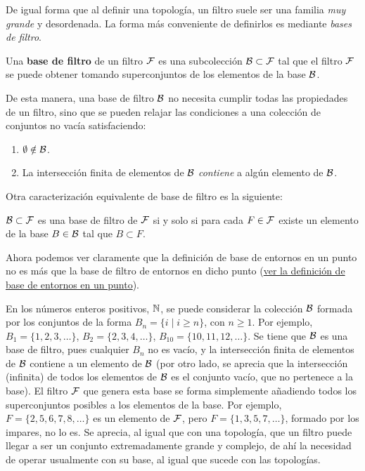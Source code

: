 \begin{amp}
    De igual forma que al definir una topología, un filtro suele ser una familia \textit{muy grande} y desordenada. La forma más conveniente de definirlos es mediante {\it bases de filtro}. 

    \begin{deff}
        Una {\bf base de filtro} de un filtro $\mathcal{F}$ es una subcolección $\mathcal{B}\subset \mathcal{F}$ tal que el filtro $\mathcal{F}$ se puede obtener tomando superconjuntos de los elementos de la base $\mathcal{B}$.
    \end{deff}

    De esta manera, una base de filtro $\mathcal{B}$ no necesita cumplir todas las propiedades de un filtro, sino que se pueden relajar las condiciones a una colección de conjuntos no vacía satisfaciendo:
    \begin{enumerate}[label=--]
        \item $\emptyset \notin \mathcal{B}$.
        \item La intersección finita de elementos de $\mathcal{B}$ {\it contiene} a algún elemento de $\mathcal{B}$.
    \end{enumerate}

    \medskip

    Otra caracterización equivalente de base de filtro es la siguiente:
    \begin{prop}
        $\mathcal{B}\subset\mathcal{F}$ es una base de filtro de $\mathcal{F}$ si y solo si para cada $F\in \mathcal{F}$ existe un elemento de la base $B\in\mathcal{B}$ tal que $B\subset F$.
    \end{prop}    
    Ahora podemos ver claramente que la definición de base de entornos en un punto no es más que la base de filtro de entornos en dicho punto (\hyperlink{def:base_de_entornos}{ver la definición de base de entornos en un punto}).

    \begin{ej}
        En los números enteros positivos, $\mathbb{N}$, se puede considerar la colección $\mathcal{B}$ formada por los conjuntos de la forma $B_n = \{i \mid i \geq n\}$, con $n\geq 1$. Por ejemplo, $B_1 = \{1,2,3,\ldots\}$, $B_2 = \{2,3,4,\ldots\}$, $B_{10} = \{10,11,12,\ldots\}$. Se tiene que $\mathcal{B}$ es una base de filtro, pues cualquier $B_n$ no es vacío, y la intersección finita de elementos de $\mathcal{B}$ contiene a un elemento de $\mathcal{B}$ (por otro lado, se aprecia que la intersección (infinita) de todos los elementos de $\mathcal{B}$ es el conjunto vacío, que no pertenece a la base). El filtro $\mathcal{F}$ que genera esta base se forma simplemente añadiendo todos los superconjuntos posibles a los elementos de la base. Por ejemplo, $F = \{2,5,6,7,8,\ldots\}$ es un elemento de $\mathcal{F}$, pero $F = \{1,3,5,7,\ldots\}$, formado por los impares, no lo es. Se aprecia, al igual que con una topología, que un filtro puede llegar a ser un conjunto extremadamente grande y complejo, de ahí la necesidad de operar usualmente con su base, al igual que sucede con las topologías.
    \end{ej}


\end{amp}
